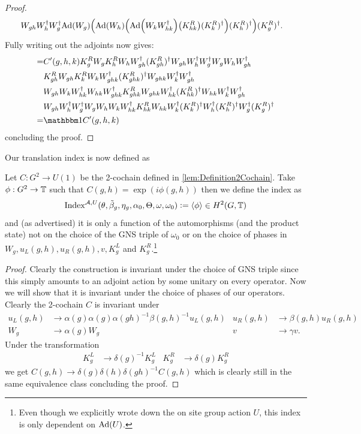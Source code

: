 \documentclass[12pt,a4paper,twoside]{article}
\numberwithin{equation}{section}
\begin{document}
\begin{proof}
\begin{align}
		\nonumber
		&W_{gh}W_h^\dagger W_g^\dagger\Ad{W_g}\left(\Ad{W_h}\left(\Ad{W_kW_{hk}^\dagger}\left(K_{hk}^R\right)(K^R_k)^\dagger\right)(K^R_h)^\dagger\right)(K^R_g)^\dagger.
	\end{align}
	Fully writing out the adjoints now gives:
	\begin{align}
	=&C'(g,h,k)K_g^RW_gK_h^RW_hW_{gh}^\dagger (K_{gh}^R)^\dagger W_{gh}W_h^\dagger W_g^\dagger W_gW_hW_{gh}^\dagger \\
	\nonumber
	&K_{gh}^RW_{gh}K_k^RW_kW_{ghk}^\dagger(K_{ghk}^R)^\dagger W_{ghk}W_k^\dagger W_{gh}^\dagger  \\
	\nonumber
	&W_{gh}W_kW_{hk}^\dagger W_{hk}W_{ghk}^\dagger K^R_{ghk} W_{ghk}W_{hk}^\dagger(K^R_{hk})^{\dagger} W_{hk}W_k^\dagger W_{gh}^\dagger\\
	\nonumber
	&W_{gh}W_h^\dagger W_g^\dagger W_gW_h W_kW_{hk}^\dagger K_{hk}^RW_{hk}W_k^\dagger(K^R_k)^\dagger W_h^\dagger (K^R_h)^\dagger W_g^\dagger (K^R_g)^\dagger\\
	=&\id C'(g,h,k)
	\end{align}
	concluding the proof.
\end{proof}
Our translation index is now defined as
\begin{definition}
	Let $C:G^2\rightarrow U(1)$ be the 2-cochain defined in \ref{lem:Definition2Cochain}. Take $\phi:G^2\rightarrow\mathbb T$ such that $C(g,h)=\exp(i\phi(g,h))$ then we define the index as
	\begin{equation}
	\textrm{Index}^{\mathcal A,U}(\theta,\tilde{\beta}_g,\eta_g,\alpha_0,\Theta,\omega,\omega_0)\vcentcolon=\expval{\phi}\in H^2(G,\mathbb T)
	\end{equation}
	and (as advertised) it is only a function of the automorphisms (and the product state) not on the choice of the GNS triple of $\omega_0$ or on the choice of phases in $W_g,u_L(g,h),u_R(g,h),v,K_g^L$ and $K_g^R$.\footnote{Even though we explicitly wrote down the on site group action $U$, this index is only dependent on $\Ad{U}$.}
\end{definition}
\begin{proof}
	Clearly the construction is invariant under the choice of GNS triple since this simply amounts to an adjoint action by some unitary on every operator. Now we will show that it is invariant under the choice of phases of our operators. Clearly the 2-cochain $C$ is invariant under
	\begin{align}
		u_L(g,h)&\rightarrow \alpha(g)\alpha(g)\alpha(gh)^{-1}\beta(g,h)^{-1} u_L(g,h)&u_R(g,h)&\rightarrow \beta(g,h)u_R(g,h)\\
		W_g&\rightarrow\alpha(g)W_g&v&\rightarrow \gamma v.
	\end{align}
	Under the transformation
	\begin{align}
		K_g^L&\rightarrow \delta(g)^{-1}K_g^L&K_g^R&\rightarrow \delta(g)K_g^R
	\end{align}
	we get $C(g,h)\rightarrow \delta(g)\delta(h)\delta(gh)^{-1}C(g,h)$ which is clearly still in the same equivalence class concluding the proof.
\end{proof}
\end{document}
